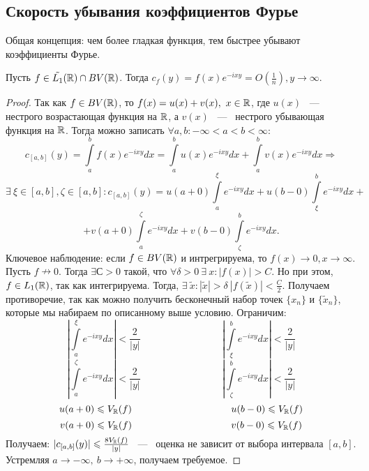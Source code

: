 \subsection{Скорость убывания коэффициентов Фурье}
Общая концепция: чем более гладкая функция, тем быстрее убывают коэффициенты Фурье. 

\begin{lemma}[Основная]
    Пусть $f \in \tilde{L_1}(\mathbb{R}) \cap BV(\mathbb{R})$. Тогда $c_f(y) = f(x) e^{-ixy} = O(\frac{1}{n}), y \rightarrow \infty$.
\end{lemma}
\begin{proof}
    Так как $f \in BV(\mathbb{R})$, то $f(x) = u(x) + v(x), \ x \in \mathbb{R}$, где $u(x)$ ~---~ нестрого возрастающая функция на $\mathbb{R}$, а $v(x)$ ~---~ нестрого убывающая функция на $\mathbb{R}$. \newline
    Тогда можно записать $\forall a, b : -\infty < a < b < \infty$:
    $$
    c_{[a, b]}(y) = \int\limits_{a}^{b} f(x) e^{-ixy} dx = \int\limits_{a}^{b} u(x) e^{-ixy} dx + \int\limits_{a}^{b} v(x) e^{-ixy} dx \Rightarrow
    $$
    $$
    \exists \ \xi \in [a, b], \zeta \in [a, b] : c_{[a, b]}(y) = u(a + 0) \int\limits_{a}^{\xi} e^{-ixy} dx + u(b - 0)\int\limits_{\xi}^{b} e^{-ixy} dx + 
    $$
    $$
     + v(a + 0) \int\limits_{a}^{\zeta} e^{-ixy} dx + v(b - 0) \int\limits_{\zeta}^{b} e^{-ixy} dx.
    $$
    Ключевое наблюдение: если $f \in BV(\mathbb{R})$ и интрегрируема, то $f(x) \rightarrow 0, x \rightarrow \infty$. \newline
    Пусть $f \nrightarrow 0$. Тогда $\exists С > 0$ такой, что $\forall \delta > 0 \ \exists \ x : |f(x)| > C$. Но при этом, $f \in L_1(\mathbb{R})$, так как интегрируема. Тогда, $\exists \ \tilde{x} : |\tilde{x}| > \delta \  |f(\tilde{x})| < \frac{C}{2}$. Получаем противоречие, так как можно получить бесконечный набор точек $\{x_n\}$ и $\{\tilde{x}_n\}$, которые мы набираем по описанному выше условию. \newline
    Ограничим: 
    $$
    \left| \int\limits_{a}^{\xi} e^{-ixy} dx \right| < \frac{2}{|y|} \hspace{100pt} \left| \int\limits_{\xi}^{b} e^{-ixy} dx \right| < \frac{2}{|y|}
    $$
    $$
    \left| \int\limits_{a}^{\zeta} e^{-ixy} dx \right| < \frac{2}{|y|} \hspace{100pt} \left| \int\limits_{\zeta}^{b} e^{-ixy} dx \right| < \frac{2}{|y|}
    $$
    $$
    u(a + 0) \le V_{\R}(f) \hspace{102pt} u(b - 0) \le V_{\R}(f)
    $$
    $$
    v(a + 0) \le V_{\R}(f) \hspace{102pt} v(b - 0) \le V_{\R}(f)
    $$
    Получаем: $|c_{[a, b]}(y)| \leqslant \frac{8 V_{\mathbb{R}}(f)}{|y|}$ ~---~ оценка не зависит от выбора интервала $[a, b]$. Устремляя $a \rightarrow -\infty, \ b \rightarrow +\infty$, получаем требуемое. 
\end{proof}

